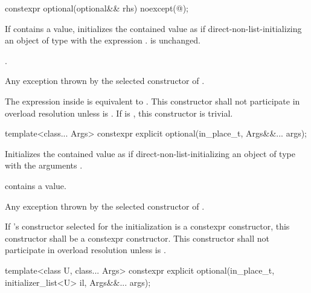 %
\begin{itemdecl}
constexpr optional(optional&& rhs) noexcept(@\seebelow@);
\end{itemdecl}

\begin{itemdescr}
\pnum
\effects
If  contains a value, initializes the contained value as if
direct-non-list-initializing an object of type  with the expression .
 is unchanged.

\pnum
\ensures
{}.

\pnum
\throws
Any exception thrown by the selected constructor of .

\pnum
\remarks
The expression inside  is equivalent to
.
This constructor shall not participate in overload resolution
unless  is .
If  is ,
this constructor is trivial.
\end{itemdescr}

%
\begin{itemdecl}
template<class... Args> constexpr explicit optional(in_place_t, Args&&... args);
\end{itemdecl}

\begin{itemdescr}
\pnum
\effects
Initializes the contained value as if direct-non-list-initializing an object of type  with the arguments .

\pnum
\ensures
{} contains a value.

\pnum
\throws
Any exception thrown by the selected constructor of .

\pnum
\remarks
If 's constructor selected for the initialization is a constexpr constructor, this constructor shall be a constexpr constructor.
This constructor shall not participate in overload resolution
unless  is .
\end{itemdescr}

%
\begin{itemdecl}
template<class U, class... Args>
  constexpr explicit optional(in_place_t, initializer_list<U> il, Args&&... args);
\end{itemdecl}

